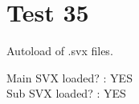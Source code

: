 \documentclass[12pt]{report}
\gdef\mainsvxgotloaded{YES}
\gdef\subsvxgotloaded{YES}
\begin{document}
\chapter{Test 35}
Autoload of .svx files.

\noindent
Main SVX loaded? : \mainsvxgotloaded \\

\noindent
Sub SVX loaded? : \subsvxgotloaded \\
\end{document}

